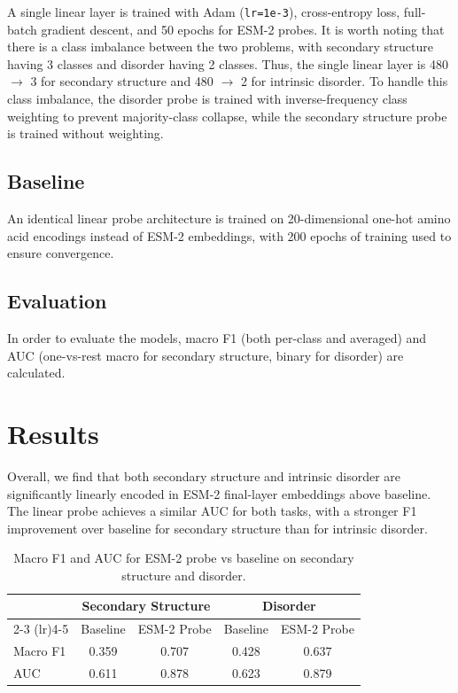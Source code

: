 \documentclass[12pt, letterpaper]{article}
\begin{document}
A single linear layer is trained with Adam (\texttt{lr=1e-3}), cross-entropy loss, full-batch gradient descent, and 50 epochs for ESM-2 probes. It is worth noting that there is a class imbalance between the two problems, with secondary structure having 3 classes and disorder having 2 classes. Thus, the single linear layer is 480 $\rightarrow$ 3 for secondary structure and 480 $\rightarrow$ 2 for intrinsic disorder. To handle this class imbalance, the disorder probe is trained with inverse-frequency class weighting to prevent majority-class collapse, while the secondary structure probe is trained without weighting. 

\subsection{Baseline}
An identical linear probe architecture is trained on 20-dimensional one-hot amino acid encodings instead of ESM-2 embeddings, with 200 epochs of training used to ensure convergence.

\subsection{Evaluation}
In order to evaluate the models, macro F1 (both per-class and averaged) and AUC (one-vs-rest macro for secondary structure, binary for disorder) are calculated. 

\section{Results}
Overall, we find that both secondary structure and intrinsic disorder are significantly linearly encoded in ESM-2 final-layer embeddings above baseline. The linear probe achieves a similar AUC for both tasks, with a stronger F1 improvement over baseline for secondary structure than for intrinsic disorder.

\begin{table}[h]
\centering
\begin{tabular}{lcccc}
\toprule
 & \multicolumn{2}{c}{Secondary Structure} & \multicolumn{2}{c}{Disorder} \\
\cmidrule(lr){2-3} \cmidrule(lr){4-5}
 & Baseline & ESM-2 Probe & Baseline & ESM-2 Probe \\
\midrule
Macro F1 & 0.359 & 0.707 & 0.428 & 0.637 \\
AUC      & 0.611 & 0.878 & 0.623 & 0.879 \\
\bottomrule
\end{tabular}
\caption{Macro F1 and AUC for ESM-2 probe vs baseline on secondary structure and disorder.}
\label{tab:summary}
\end{table}
\end{document}
